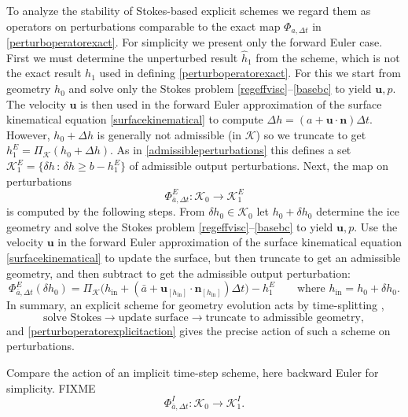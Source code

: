 \documentclass[letterpaper,final,12pt,reqno]{amsart}
\newcommand{\bn}{\mathbf{n}}
\newcommand{\bu}{\mathbf{u}}
\newcommand{\PiK}{\Pi_{\mathcal{K}}}
\newcommand{\hin}{h_{\text{in}}}
\begin{document}
To analyze the stability of Stokes-based explicit schemes we regard them as operators on perturbations comparable to the exact map $\Phi_{a,\Delta t}$ in \eqref{perturboperatorexact}.  For simplicity we present only the forward Euler case.  First we must determine the unperturbed result $\hat h_1$ from the scheme, which is not the exact result $h_1$ used in defining \eqref{perturboperatorexact}.  For this we start from geometry $h_0$ and solve only the Stokes problem \eqref{regeffvisc}--\eqref{basebc} to yield $\bu,p$.  The velocity $\bu$ is then used in the forward Euler approximation of the surface kinematical equation \eqref{surfacekinematical} to compute $\Delta h = \left(a + \bu\cdot \bn\right) \Delta t$.  However, $h_0+\Delta h$ is generally not admissible (in $\mathcal{K}$) so we truncate to get $h^E_1 = \PiK(h_0+\Delta h)$.  As in \eqref{admissibleperturbations} this defines a set $\mathcal{K}^E_1=\{\delta h \,:\, \delta h \ge b - h^E_1\}$ of admissible output perturbations.  Next, the map on perturbations
\begin{equation}
\Phi^E_{\bar a,\Delta t} : \mathcal{K}_0 \to \mathcal{K}^E_1 \label{perturboperatorexplicit}
\end{equation}
is computed by the following steps.  From $\delta h_0 \in \mathcal{K}_0$ let $h_0+\delta h_0$ determine the ice geometry and solve the Stokes problem \eqref{regeffvisc}--\eqref{basebc} to yield $\bu,p$.  Use the velocity $\bu$ in the forward Euler approximation of the surface kinematical equation \eqref{surfacekinematical} to update the surface, but then truncate to get an admissible geometry, and then subtract to get the admissible output perturbation:
\begin{equation}
\Phi^E_{\bar a,\Delta t}(\delta h_0) = \PiK\Big(\hin + \left(\bar a + \bu_{[\hin]} \cdot \bn_{[\hin]}\right) \Delta t\Big) - h^E_1 \qquad \text{where } \hin=h_0+\delta h_0. \label{perturboperatorexplicitaction}
\end{equation}
In summary, an explicit scheme for geometry evolution acts by time-splitting \cite{LeVeque2007},
    $$\text{solve Stokes} \to \text{update surface} \to \text{truncate to admissible geometry},$$
and \eqref{perturboperatorexplicitaction} gives the precise action of such a scheme on perturbations.

Compare the action of an implicit time-step scheme, here backward Euler for simplicity.  FIXME
\begin{equation}
\Phi^I_{\bar a,\Delta t} : \mathcal{K}_0 \to \mathcal{K}^I_1. \label{perturboperatorimplicit}
\end{equation}
\end{document}
